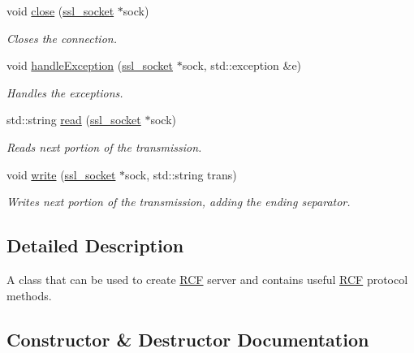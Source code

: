 \begin{DoxyCompactItemize}
void \hyperlink{class_r_c_f_1_1_server_1_1_server_acf8a3de00138b3c60d542b4d041b68c6}{close} (\hyperlink{_server_8h_a099e2c9fff985800932f4c424a126989}{ssl\+\_\+socket} $\ast$sock)
\begin{DoxyCompactList}\small\item\em Closes the connection. \end{DoxyCompactList}\item 
void \hyperlink{class_r_c_f_1_1_server_1_1_server_a16a2d2c9850d5b8ab526f6df4d6cc4c7}{handle\+Exception} (\hyperlink{_server_8h_a099e2c9fff985800932f4c424a126989}{ssl\+\_\+socket} $\ast$sock, std\+::exception \&e)
\begin{DoxyCompactList}\small\item\em Handles the exceptions. \end{DoxyCompactList}\item 
std\+::string \hyperlink{class_r_c_f_1_1_server_1_1_server_a7eb3a657281ffe1791a7b8c73df3b714}{read} (\hyperlink{_server_8h_a099e2c9fff985800932f4c424a126989}{ssl\+\_\+socket} $\ast$sock)
\begin{DoxyCompactList}\small\item\em Reads next portion of the transmission. \end{DoxyCompactList}\item 
void \hyperlink{class_r_c_f_1_1_server_1_1_server_a7a251b9e3a4c4cbae84c042f94d16a6c}{write} (\hyperlink{_server_8h_a099e2c9fff985800932f4c424a126989}{ssl\+\_\+socket} $\ast$sock, std\+::string trans)
\begin{DoxyCompactList}\small\item\em Writes next portion of the transmission, adding the ending separator. \end{DoxyCompactList}\end{DoxyCompactItemize}


\subsection{Detailed Description}
A class that can be used to create \hyperlink{namespace_r_c_f}{R\+C\+F} server and contains useful \hyperlink{namespace_r_c_f}{R\+C\+F} protocol methods. 

\subsection{Constructor \& Destructor Documentation}
\hypertarget{class_r_c_f_1_1_server_1_1_server_a75475bf21a8460ac35c472c6a886c61a}{}
